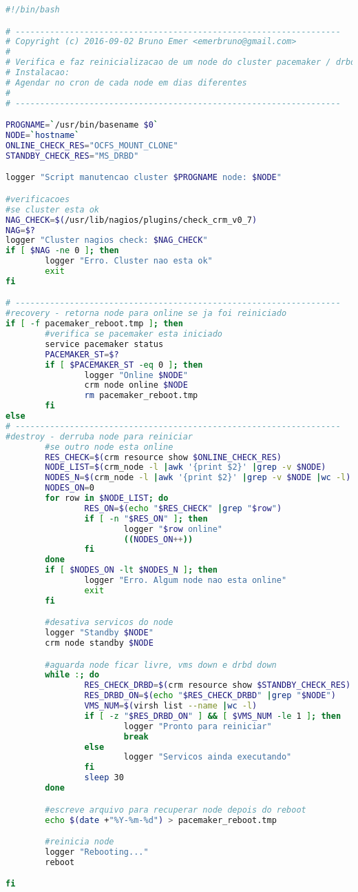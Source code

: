 \begin{lstlisting}[language=bash]
#!/bin/bash

# ------------------------------------------------------------------
# Copyright (c) 2016-09-02 Bruno Emer <emerbruno@gmail.com>
#
# Verifica e faz reinicializacao de um node do cluster pacemaker / drbd
# Instalacao:
# Agendar no cron de cada node em dias diferentes
#
# ------------------------------------------------------------------

PROGNAME=`/usr/bin/basename $0`
NODE=`hostname`
ONLINE_CHECK_RES="OCFS_MOUNT_CLONE"
STANDBY_CHECK_RES="MS_DRBD"

logger "Script manutencao cluster $PROGNAME node: $NODE"

#verificacoes
#se cluster esta ok
NAG_CHECK=$(/usr/lib/nagios/plugins/check_crm_v0_7)
NAG=$?
logger "Cluster nagios check: $NAG_CHECK"
if [ $NAG -ne 0 ]; then
        logger "Erro. Cluster nao esta ok"
        exit
fi

# ------------------------------------------------------------------
#recovery - retorna node para online se ja foi reiniciado
if [ -f pacemaker_reboot.tmp ]; then
        #verifica se pacemaker esta iniciado
        service pacemaker status
        PACEMAKER_ST=$?
        if [ $PACEMAKER_ST -eq 0 ]; then
                logger "Online $NODE"
                crm node online $NODE
                rm pacemaker_reboot.tmp
        fi
else
# ------------------------------------------------------------------
#destroy - derruba node para reiniciar
        #se outro node esta online
        RES_CHECK=$(crm resource show $ONLINE_CHECK_RES)
        NODE_LIST=$(crm_node -l |awk '{print $2}' |grep -v $NODE)
        NODES_N=$(crm_node -l |awk '{print $2}' |grep -v $NODE |wc -l)
        NODES_ON=0
        for row in $NODE_LIST; do
                RES_ON=$(echo "$RES_CHECK" |grep "$row")
                if [ -n "$RES_ON" ]; then
                        logger "$row online"
                        ((NODES_ON++))
                fi
        done
        if [ $NODES_ON -lt $NODES_N ]; then
                logger "Erro. Algum node nao esta online"
                exit
        fi

        #desativa servicos do node
        logger "Standby $NODE"
        crm node standby $NODE

        #aguarda node ficar livre, vms down e drbd down
        while :; do
                RES_CHECK_DRBD=$(crm resource show $STANDBY_CHECK_RES)
                RES_DRBD_ON=$(echo "$RES_CHECK_DRBD" |grep "$NODE")
                VMS_NUM=$(virsh list --name |wc -l)
                if [ -z "$RES_DRBD_ON" ] && [ $VMS_NUM -le 1 ]; then
                        logger "Pronto para reiniciar"
                        break
                else
                        logger "Servicos ainda executando"
                fi
                sleep 30
        done

        #escreve arquivo para recuperar node depois do reboot
        echo $(date +"%Y-%m-%d") > pacemaker_reboot.tmp

        #reinicia node
        logger "Rebooting..."
        reboot

fi
\end{lstlisting}
